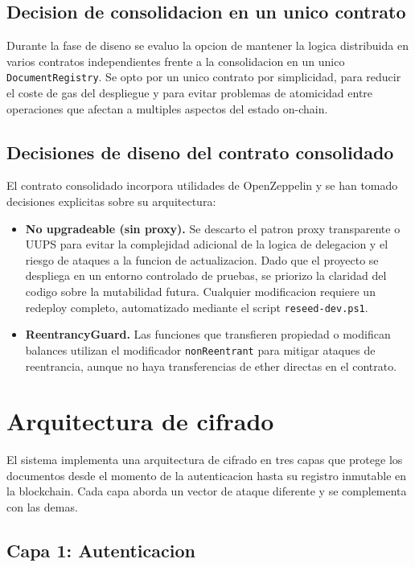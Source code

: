 \documentclass[11pt, a4paper]{article}
\begin{document}
\subsection{Decision de consolidacion en un unico contrato}

Durante la fase de diseno se evaluo la opcion de mantener la logica distribuida en varios contratos independientes frente a la consolidacion en un unico \texttt{DocumentRegistry}. Se opto por un unico contrato por simplicidad, para reducir el coste de gas del despliegue y para evitar problemas de atomicidad entre operaciones que afectan a multiples aspectos del estado on-chain.

\subsection{Decisiones de diseno del contrato consolidado}

El contrato consolidado incorpora utilidades de OpenZeppelin y se han tomado decisiones explicitas sobre su arquitectura:

\begin{itemize}
    \item \textbf{No upgradeable (sin proxy).} Se descarto el patron proxy transparente o UUPS para evitar la complejidad adicional de la logica de delegacion y el riesgo de ataques a la funcion de actualizacion. Dado que el proyecto se despliega en un entorno controlado de pruebas, se priorizo la claridad del codigo sobre la mutabilidad futura. Cualquier modificacion requiere un redeploy completo, automatizado mediante el script \texttt{reseed-dev.ps1}.
    \item \textbf{ReentrancyGuard.} Las funciones que transfieren propiedad o modifican balances utilizan el modificador \texttt{nonReentrant} para mitigar ataques de reentrancia, aunque no haya transferencias de ether directas en el contrato.
\end{itemize}

\section{Arquitectura de cifrado}

El sistema implementa una arquitectura de cifrado en tres capas que protege los documentos desde el momento de la autenticacion hasta su registro inmutable en la blockchain. Cada capa aborda un vector de ataque diferente y se complementa con las demas.

\subsection{Capa 1: Autenticacion}
\end{document}
